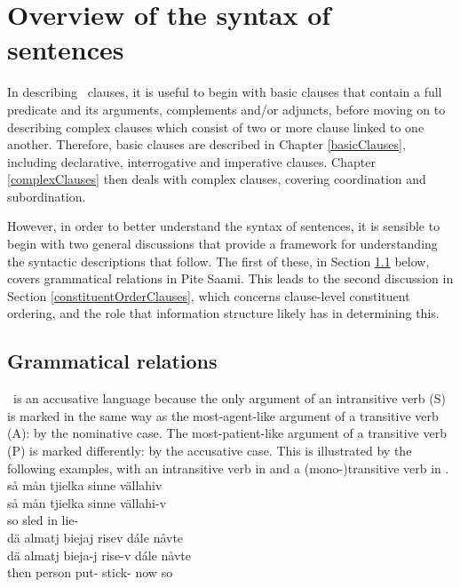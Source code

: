 


\chapter{Overview of the syntax of sentences}\label{overviewSyntax}
In describing \PS\ clauses, it is useful to begin with basic clauses that contain a full predicate and its arguments, complements and/or adjuncts, before moving on to describing complex clauses which consist of two or more clause linked to one another. 
Therefore, basic clauses are described in Chapter \ref{basicClauses}, including declarative, interrogative and imperative clauses. Chapter \ref{complexClauses} then deals with complex clauses, covering coordination and subordination. 

However, in order to better understand the syntax of sentences, it is sensible to begin with two general discussions that provide a framework for understanding the syntactic descriptions that follow. The first of these, in Section \ref{grammaticalRelations} below, covers grammatical relations in Pite Saami. This leads to the second discussion in Section \ref{constituentOrderClauses}, which concerns clause-level constituent ordering, and the role that information structure likely has in determining this.


\section{Grammatical relations}\label{grammaticalRelations}
\PS\ is an accusative language because %
the only argument of an intransitive verb (S) is marked in the same way as %
the most-agent-like argument of a transitive verb (A): by the nominative case. The %
most-patient-like argument of a transitive verb (P) is marked differently: by the accusative case. This is illustrated by the following examples, with an intransitive verb in  and a (mono-)transitive verb in .
\ea\label{intrans1}
\glll	så mån tjielka sinne vällahiv\\
	så mån tjielka sinne vällahi-v\\
	so  sled\BS{} in lie-\\\nopagebreak
{} 
\z
\ea\label{monotrans1}
\glll	dä almatj biejaj risev dále nåvte\\
	dä almatj bieja-j rise-v dále nåvte\\
	then person\BS{} put- stick- now so\\\nopagebreak
{} 
\z

